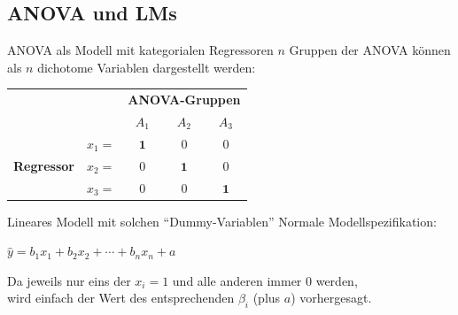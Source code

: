 \subsection{ANOVA und LMs}

\begin{frame}
  {ANOVA als Modell mit kategorialen Regressoren}
  $n$ Gruppen der ANOVA können als $n$ dichotome Variablen dargestellt werden:\\
  \vspace{0.5cm}
  \begin{center}
    \begin{tabular}[h!]{|c|c|c|c|c|}
      \cline{3-5}
      \multicolumn{2}{c|}{} & \multicolumn{3}{c|}{\textbf{ANOVA-Gruppen}} \\
      \cline{3-5}
      \multicolumn{2}{c|}{} & $A_1$ & $A_2$ & $A_3$ \\
      \hline
      \multirow{3}{*}{\begin{sideways}\textbf{Regressor}\end{sideways}} & \rule{0em}{2em} $x_1=$ & $\mathbf{1}$ & $0$ & $0$ \\
      \cline{2-5}
      & \rule{0em}{2em} $x_2=$ & $0$ & $\mathbf{1}$ & $0$ \\
      \cline{2-5}
      & \rule{0em}{2em} $x_3=$ & $0$ & $0$ & $\mathbf{1}$ \\
      \hline
    \end{tabular}
  \end{center}
\end{frame}

\begin{frame}
  {Lineares Modell mit solchen "`Dummy-Variablen"'}
  Normale Modellspezifikation:

  \begin{center}
    $\hat{y}=b_1x_1 + b_2x_2 + \cdots + b_nx_n + a$
  \end{center}
  \vspace{0.5cm}
  \pause
  \begin{center}
    Da jeweils nur eins der $x_i=1$ und alle anderen immer $0$ werden,\\
    wird einfach der Wert des entsprechenden $\beta_i$ (plus $a$) vorhergesagt.
  \end{center}
\end{frame}

